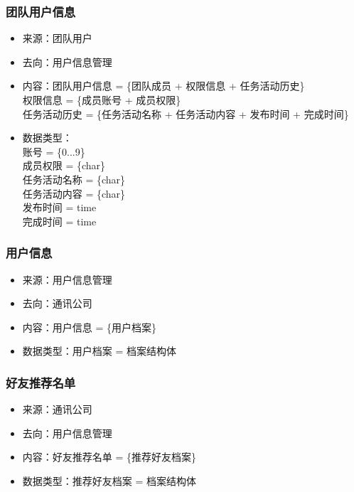             \subsubsection{团队用户信息}
            \begin{itemize}
                \item 来源：团队用户
                \item 去向：用户信息管理
                \item 内容：团队用户信息 = \{团队成员 + 权限信息 + 任务活动历史\} \\
                     权限信息 = \{成员账号 + 成员权限\}\\
                     任务活动历史 = \{任务活动名称 + 任务活动内容 + 发布时间 + 完成时间\}\\
                \item 数据类型：\\
                账号 = \{0...9\}\\
                成员权限 = \{char\}\\
                任务活动名称 = \{char\}\\
                任务活动内容 = \{char\}\\
                发布时间 = time\\
                完成时间 = time\\
            \end{itemize}
            \subsubsection{用户信息}
            \begin{itemize}
                \item 来源：用户信息管理
                \item 去向：通讯公司
                \item 内容：用户信息 = \{用户档案\}
                \item 数据类型：用户档案 = 档案结构体
            \end{itemize}
            \subsubsection{好友推荐名单}
            \begin{itemize}
                \item 来源：通讯公司
                \item 去向：用户信息管理
                \item 内容：好友推荐名单 = \{推荐好友档案\}
                \item 数据类型：推荐好友档案 = 档案结构体
            \end{itemize}
